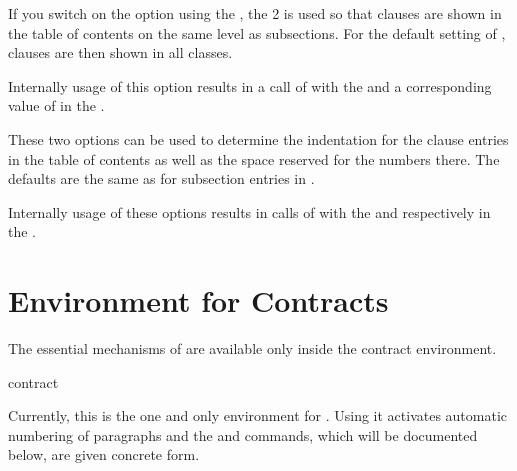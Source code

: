If you switch on the option using the %
, the  2 is used
so that clauses are shown in the table of contents on the same level as
subsections. For the default setting of ,
clauses are then shown in all \KOMAScript{} classes.

Internally usage of this option results in
a call of
with the   and a corresponding value of
 in the .%
\EndIndexGroup


\begin{Declaration}
\end{Declaration}
These two options can be used to determine the indentation for the clause
entries in the table of contents as well as the space reserved for the numbers
there. The defaults are the same as for subsection entries in
.

Internally usage of these options results
in calls of
with the   and 
respectively  in the .%
\EndIndexGroup


\section{Environment for Contracts}
\label{sec:scrjura.contract}

\BeginIndexGroup
{}
The essential mechanisms of  are available only inside the
contract environment.

\begin{Declaration}
  \begin{Environment}{contract}\end{Environment}
\end{Declaration}
Currently, this is the one and only environment for . Using
it activates automatic numbering of paragraphs and the
 and 
commands, which will be documented below, are given concrete form.

